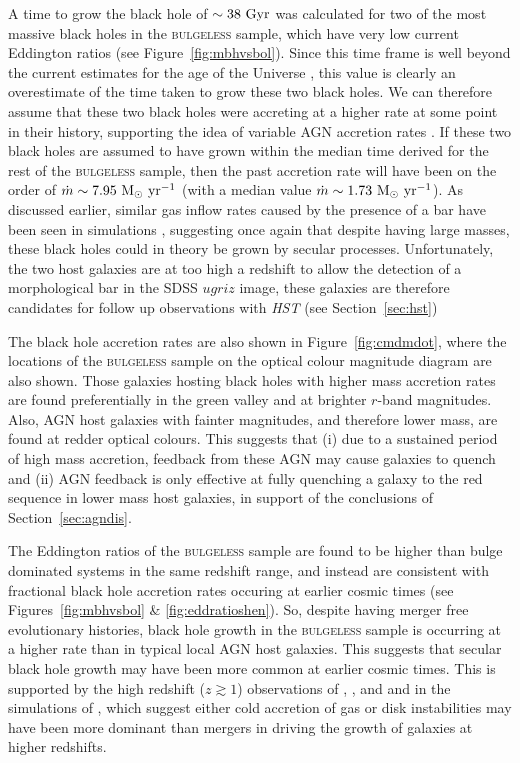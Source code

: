 {A time to grow the black hole of $\sim 38 ~\rm{Gyr}$ was calculated for two of the most massive black holes in the \textsc{bulgeless} sample, which have very low current Eddington ratios (see Figure~\ref{fig:mbhvsbol}). Since this time frame is well beyond the current estimates for the age of the Universe \citep[$\sim13.8 ~\rm{Gyr}$;][]{planck16}, this value is clearly an overestimate of the time taken to grow these two black holes. We can therefore assume that these two black holes were accreting at a higher rate at some point in their history, supporting the idea of variable AGN accretion rates \citep{martini01, yu02, schawinski15}.  If these two black holes are assumed to have grown within the median time derived for the rest of the \textsc{bulgeless} sample, then the past accretion rate will have been on the order of $\dot{m} \sim 7.95 ~\rm{M}_{\odot}~\rm{yr}^{-1}$ (with a median value $\dot{m} \sim 1.73 ~\rm{M}_{\odot}~\rm{yr}^{-1}$). As discussed earlier, similar gas inflow rates caused by the presence of a bar have been seen in simulations \citep{friedli93}, suggesting once again that despite having large masses, these black holes could in theory be grown by secular processes. Unfortunately, the two host galaxies are at too high a redshift to allow the detection of a morphological bar in the SDSS $ugriz$ image, these galaxies are therefore candidates for follow up observations with \emph{HST} (see Section~\ref{sec:hst}) 

The black hole accretion rates are also shown in Figure~\ref{fig:cmdmdot}, where the locations of the \textsc{bulgeless} sample on the optical colour magnitude diagram are also shown. Those galaxies hosting black holes with higher mass accretion rates are found preferentially in the green valley and at brighter $r$-band magnitudes. Also, AGN host galaxies with fainter magnitudes, and therefore lower mass, are found at redder optical colours. This suggests that (i) due to a sustained period of high mass accretion, feedback from these AGN may cause galaxies to quench and (ii) AGN feedback is only effective at fully quenching a galaxy to the red sequence in lower mass host galaxies, in support of the conclusions of Section~\ref{sec:agndis}.

The Eddington ratios of the \textsc{bulgeless} sample are found to be higher than bulge dominated systems in the same redshift range, and instead are consistent with fractional black hole accretion rates occuring at earlier cosmic times (see Figures~\ref{fig:mbhvsbol} \& \ref{fig:eddratioshen}). So, despite having merger free evolutionary histories, black hole growth in the \textsc{bulgeless} sample is occurring at a higher rate than in typical local AGN host galaxies. This suggests that secular black hole growth may have been more common at earlier cosmic times. This is supported by the high redshift ($z\gtrsim1$) observations of \cite{georgakakis09}, \cite{cisternas11}, \cite{schawinski11} and \cite{kocevski12} and in the simulations of \cite{hopkins06c}, \cite{bournard11,bournaud12} which suggest either cold accretion of gas or disk instabilities may have been more dominant than mergers in driving the growth of galaxies at higher redshifts. 


}
